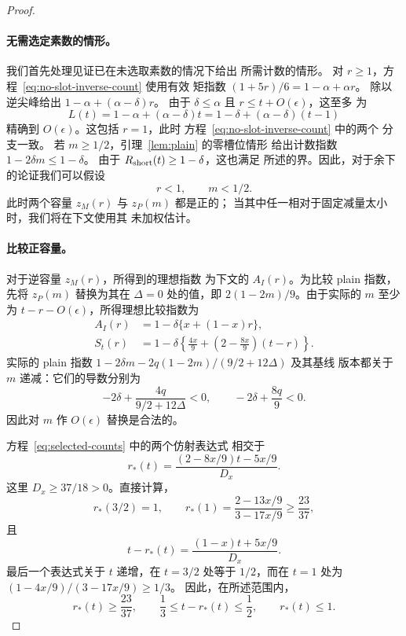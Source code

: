 \documentclass[11pt,a4paper]{article}
\numberwithin{equation}{section}
\numberwithin{figure}{section}
\theoremstyle{definition}
\theoremstyle{remark}
\begin{document}
\begin{proof}
\paragraph{无需选定素数的情形。}
我们首先处理见证已在未选取素数的情况下给出
所需计数的情形。
对 \(r\ge1\)，方程~\eqref{eq:no-slot-inverse-count} 使用有效
矩指数 \((1+5r)/6=1-\alpha+\alpha r\)。
除以逆尖峰给出
\(1-\alpha+(\alpha-\delta)r\)。
由于 \(\delta\le\alpha\) 且 \(r\le t+O(\epsilon)\)，这至多
为
\begin{equation}
 L(t)=1-\alpha+(\alpha-\delta)t
     =1-\delta+(\alpha-\delta)(t-1)
 \label{eq:long-count}
\end{equation}
精确到 \(O(\epsilon)\)。这包括 \(r=1\)，此时
方程~\eqref{eq:no-slot-inverse-count} 中的两个
分支一致。
若 \(m\ge1/2\)，引理~\ref{lem:plain} 的零槽位情形
给出计数指数 \(1-2\delta m\le1-\delta\)。
由于 \(R_{\rm short}(t)\ge1-\delta\)，这也满足
所述的界。因此，对于余下的论证我们可以假设
\[
 r<1,\qquad m<1/2.
\]
此时两个容量 \(z_M(r)\) 与 \(z_P(m)\) 都是正的；
当其中任一相对于固定减量太小时，我们将在下文使用其
未加权估计。

\paragraph{比较正容量。}
对于逆容量 \(z_M(r)\)，所得到的理想指数
为下文的 \(A_I(r)\)。为比较 plain 指数，先将
\(z_P(m)\) 替换为其在 \(\Delta=0\) 处的值，即
\(2(1-2m)/9\)。由于实际的 \(m\) 至少为
\(t-r-O(\epsilon)\)，所得理想比较指数为
\begin{equation}
 \begin{aligned}
 A_I(r)&=1-\delta\{x+(1-x)r\},\\
 S_t(r)&=1-\delta\left\{\frac{4x}{9}
          +\left(2-\frac{8x}{9}\right)(t-r)\right\}.
 \end{aligned}
 \label{eq:selected-counts}
\end{equation}
实际的 plain 指数
\(1-2\delta m-2q(1-2m)/(9/2+12\Delta)\) 及其基线
版本都关于 \(m\) 递减：它们的导数分别为
\[
 -2\delta+\frac{4q}{9/2+12\Delta}<0,\qquad
 -2\delta+\frac{8q}{9}<0.
\]
因此对 \(m\) 作 \(O(\epsilon)\) 替换是合法的。

方程~\eqref{eq:selected-counts} 中的两个仿射表达式
相交于
\[
 r_*(t)=
 \frac{(2-8x/9)t-5x/9}{D_x}.
\]
这里 \(D_x\ge37/18>0\)。直接计算，
\[
 r_*(3/2)=1,\qquad
 r_*(1)=\frac{2-13x/9}{3-17x/9}\ge\frac{23}{37},
\]
且
\[
 t-r_*(t)=\frac{(1-x)t+5x/9}{D_x}.
\]
最后一个表达式关于 \(t\) 递增，在
\(t=3/2\) 处等于 \(1/2\)，而在 \(t=1\) 处为
\((1-4x/9)/(3-17x/9)\ge1/3\)。
因此，在所述范围内，
\[
 r_*(t)\ge\frac{23}{37},\qquad
 \frac13\le t-r_*(t)\le\frac12,\qquad r_*(t)\le1.
\]


\end{proof}
\end{document}
